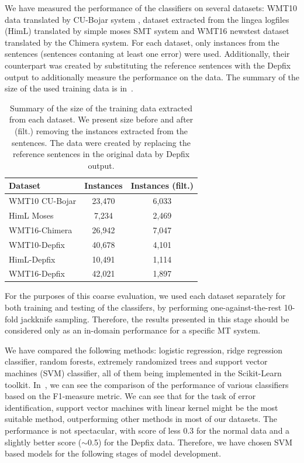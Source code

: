 We have measured the performance of the classifiers on several datasets:
WMT10 data translated by CU-Bojar system \citep{biblio:BoJaProbesin2012},
dataset extracted from the lingea logfiles (HimL) translated by simple moses SMT system \citep{Koehn:2007:MOS:1557769.1557821} and
WMT16 newstest dataset translated by the Chimera system.
For each dataset, only instances from the  sentences (sentences contaning at least one error)
were used.
Additionally, their counterpart was
created by substituting the reference sentences with the Depfix output
to additionally measure the performance on the  data.
The summary of the size of the used training data is in~.

\begin{table}[t]
\centering
\small

\begin{tabular}{lcc}
Dataset  &  \hash{} Instances  &  \hash{} Instances (filt.)  \\
\hline
WMT10 CU-Bojar  &  23,470  &  6,033  \\
HimL Moses  & 7,234  &  2,469  \\
WMT16-Chimera  &  26,942  &  7,047  \\
WMT10-Depfix  &  40,678  &  4,101  \\
HimL-Depfix  &  10,491  &  1,114  \\
WMT16-Depfix  &  42,021  &  1,897  \\
\end{tabular}
\caption{
    Summary of the size of the training data extracted from each dataset. We present
size before and after (filt.) removing the instances extracted from the  sentences.
The  data were created by replacing the reference sentences in the original
data by Depfix output.
}
\label{wf-training-sum}
\end{table}


For the purposes of this coarse evaluation, we used each dataset separately for both training
and testing of the classifers, by performing one-against-the-rest 10-fold jackknife sampling.
Therefore, the results presented in this stage should be considered only as an in-domain
performance for a specific MT system.

We have compared the following methods: logistic regression, ridge regression classifier,
random forests, extremely randomized trees and support vector machines (SVM) classifier, all
of them being implemented in the Scikit-Learn toolkit.
In~, we can see the comparison of the performance of various classifiers based
on the F1-measure metric. We can see that for the task of error identification, support vector
machines with linear kernel might be the most suitable method, outperforming other methods in most of our
datasets. The  performance is not spectacular, with score of less 0.3 for the normal data
and a slightly better score ($\sim$0.5) for the Depfix data. Therefore, we have chosen SVM based
models for the following stages of model development.

